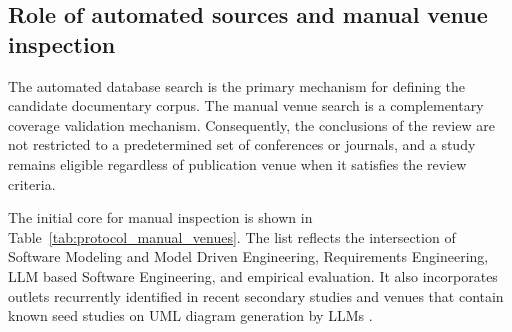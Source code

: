 \subsection{Role of automated sources and manual venue inspection}

The automated database search is the primary mechanism for defining the candidate documentary corpus. The manual venue search is a complementary coverage validation mechanism. Consequently, the conclusions of the review are not restricted to a predetermined set of conferences or journals, and a study remains eligible regardless of publication venue when it satisfies the review criteria.

The initial core for manual inspection is shown in Table~\ref{tab:protocol_manual_venues}. The list reflects the intersection of Software Modeling and Model Driven Engineering, Requirements Engineering, LLM based Software Engineering, and empirical evaluation. It also incorporates outlets recurrently identified in recent secondary studies and venues that contain known seed studies on UML diagram generation by LLMs \cite{Zhang2027LLMMDE,Rahmanian2026Diagrams,DeBari2024UML,Ferrari2024Sequence,Garaccione2025Class,Garaccione2025UseCase,Xiao2025Sequence}.

